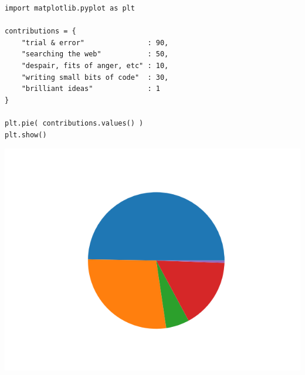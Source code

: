 
\begin{frame}[fragile]
%
\begin{tcbraster}[raster columns=2,
                  raster equal height,
                  nobeforeafter,
                  raster column skip=0.2cm]
\begin{codebox}
\begin{verbatim}
import matplotlib.pyplot as plt

contributions = {
    "trial & error"               : 90,
    "searching the web"           : 50,
    "despair, fits of anger, etc" : 10,
    "writing small bits of code"  : 30,
    "brilliant ideas"             : 1
}

plt.pie( contributions.values() )
plt.show()
\end{verbatim}
\end{codebox}
%
\begin{tcolorbox}[title=Output: Pie Charts (Simple)]
	\includegraphics[width=\linewidth]{./gfx/plt-pie-simple}
\end{tcolorbox}
\end{tcbraster}
%
\end{frame}


